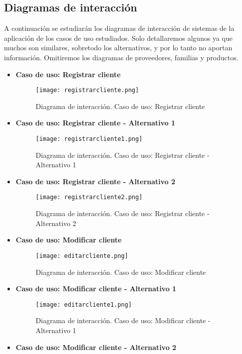 \subsection{Diagramas de interacción}
A continuación se estudiarán los diagramas de interacción de sistemas de la aplicación de los casos de uso estudiados. Solo detallaremos algunos ya que muchos son similares, sobretodo los alternativos, y por lo tanto no aportan información. Omitiremos los diagramas de proveedores, familias y productos.\\
\begin{itemize}
\item \textbf{Caso de uso: Registrar cliente}
\begin{figure}[!htb]
  \centering
    \texttt{[image: registrarcliente.png]}
  \caption{Diagrama de interacción. Caso de uso: Registrar cliente}
  \label{a}
\end{figure}
\clearpage
\item \textbf{Caso de uso: Registrar cliente - Alternativo 1}
\begin{figure}[!htb]
  \centering
    \texttt{[image: registrarcliente1.png]}
  \caption{Diagrama de interacción. Caso de uso: Registrar cliente - Alternativo 1}
  \label{a}
\end{figure}
\item \textbf{Caso de uso: Registrar cliente - Alternativo 2}
\begin{figure}[!htb]
  \centering
    \texttt{[image: registrarcliente2.png]}
  \caption{Diagrama de interacción. Caso de uso: Registrar cliente - Alternativo 2}
  \label{a}
\end{figure}
\clearpage
\item \textbf{Caso de uso: Modificar cliente}
\begin{figure}[!htb]
  \centering
    \texttt{[image: editarcliente.png]}
  \caption{Diagrama de interacción. Caso de uso: Modificar cliente}
  \label{a}
\end{figure}

\newpage
\item \textbf{Caso de uso: Modificar cliente - Alternativo 1}
\begin{figure}[!htb]
  \centering
    \texttt{[image: editarcliente1.png]}
  \caption{Diagrama de interacción. Caso de uso: Modificar cliente - Alternativo 1}
  \label{a}
\end{figure}

\item \textbf{Caso de uso: Modificar cliente - Alternativo 2}


\end{itemize}
